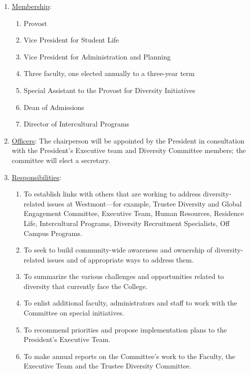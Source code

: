 					\begin{enumerate}[label=\alph*)]
						\item{\underline{Membership}:
							\begin{enumerate}[label=\arabic*)]
								\item{Provost}
								\item{Vice President for Student Life}
								\item{Vice President for Administration and Planning}
								\item{Three faculty, one elected annually to a three-year term}
								\item{Special Assistant to the Provost for Diversity Initiatives}
								\item{Dean of Admissions}
								\item{Director of Intercultural Programs}
							\end{enumerate}
						}
						\item{\underline{Officers}:
							The chairperson will be appointed by the President in consultation with the President's Executive team and Diversity Committee members; the committee will elect a secretary.}
						\item{\underline{Responsibilities}:
							\begin{enumerate}[label=\arabic*)]
								\item{To establish links with others that are working to address diversity-related issues at Westmont---for example, Trustee Diversity and Global Engagement Committee, Executive Team, Human Resources, Residence Life, Intercultural Programs, Diversity Recruitment Specialists, Off Campus Programs.}
								\item{To seek to build community-wide awareness and ownership of diversity-related issues and of appropriate ways to address them.}
								\item{To summarize the various challenges and opportunities related to diversity that currently face the College.}
								\item{To enlist additional faculty, administrators and staff to work with the Committee on special initiatives.}
								\item{To recommend priorities and propose implementation plans to the President's Executive Team.}
								\item{To make annual reports on the Committee's work to the Faculty, the Executive Team and the Trustee Diversity Committee.}
							\end{enumerate}
						}
					\end{enumerate}
